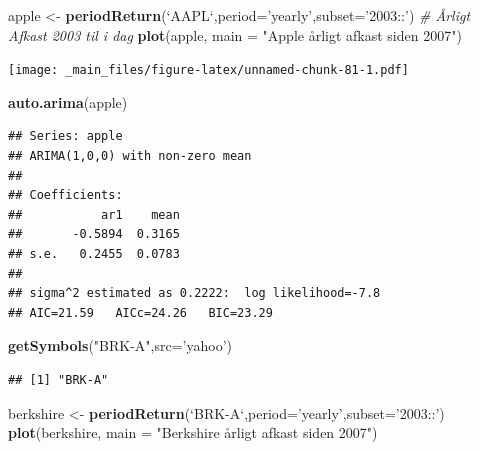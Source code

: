 \documentclass[]{book}
\newenvironment{Shaded}{\begin{snugshade}}{\end{snugshade}}
\newcommand{\CommentTok}[1]{\textcolor[rgb]{0.56,0.35,0.01}{\textit{#1}}}
\newcommand{\DataTypeTok}[1]{\textcolor[rgb]{0.13,0.29,0.53}{#1}}
\newcommand{\KeywordTok}[1]{\textcolor[rgb]{0.13,0.29,0.53}{\textbf{#1}}}
\newcommand{\NormalTok}[1]{#1}
\newcommand{\StringTok}[1]{\textcolor[rgb]{0.31,0.60,0.02}{#1}}
\begin{document}
\begin{Shaded}
\begin{Highlighting}[]
\NormalTok{apple <-}\StringTok{ }\KeywordTok{periodReturn}\NormalTok{(}\StringTok{`}\DataTypeTok{AAPL}\StringTok{`}\NormalTok{,}\DataTypeTok{period=}\StringTok{'yearly'}\NormalTok{,}\DataTypeTok{subset=}\StringTok{'2003::'}\NormalTok{)  }\CommentTok{# Årligt Afkast 2003 til i dag}
\KeywordTok{plot}\NormalTok{(apple, }\DataTypeTok{main =} \StringTok{"Apple årligt afkast siden 2007"}\NormalTok{)}
\end{Highlighting}
\end{Shaded}

\texttt{[image: \_main\_files/figure-latex/unnamed-chunk-81-1.pdf]}

\begin{Shaded}
\begin{Highlighting}[]
\KeywordTok{auto.arima}\NormalTok{(apple)}
\end{Highlighting}
\end{Shaded}

\begin{verbatim}
## Series: apple 
## ARIMA(1,0,0) with non-zero mean 
## 
## Coefficients:
##           ar1    mean
##       -0.5894  0.3165
## s.e.   0.2455  0.0783
## 
## sigma^2 estimated as 0.2222:  log likelihood=-7.8
## AIC=21.59   AICc=24.26   BIC=23.29
\end{verbatim}

\begin{Shaded}
\begin{Highlighting}[]
\KeywordTok{getSymbols}\NormalTok{(}\StringTok{"BRK-A"}\NormalTok{,}\DataTypeTok{src=}\StringTok{'yahoo'}\NormalTok{)}
\end{Highlighting}
\end{Shaded}

\begin{verbatim}
## [1] "BRK-A"
\end{verbatim}

\begin{Shaded}
\begin{Highlighting}[]
\NormalTok{berkshire <-}\StringTok{ }\KeywordTok{periodReturn}\NormalTok{(}\StringTok{`}\DataTypeTok{BRK-A}\StringTok{`}\NormalTok{,}\DataTypeTok{period=}\StringTok{'yearly'}\NormalTok{,}\DataTypeTok{subset=}\StringTok{'2003::'}\NormalTok{)}
\KeywordTok{plot}\NormalTok{(berkshire, }\DataTypeTok{main =} \StringTok{"Berkshire årligt afkast siden 2007"}\NormalTok{)}
\end{Highlighting}
\end{Shaded}
\end{document}
